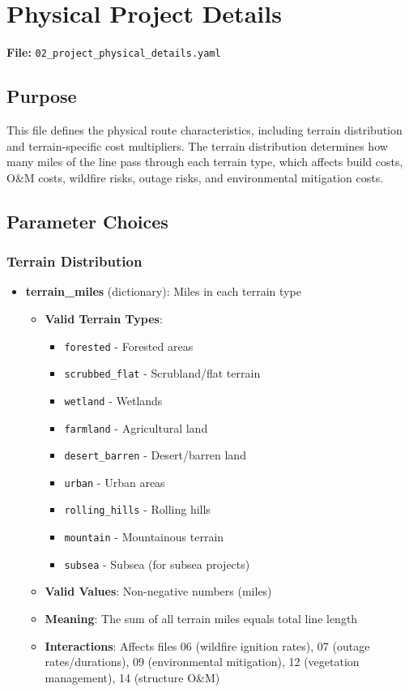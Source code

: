 \documentclass[ctcc_full_documentation.tex]{subfiles}
\begin{document}
\section{Physical Project Details}
\label{sec:physical_details}

\textbf{File:} \texttt{02\_project\_physical\_details.yaml}

\subsection{Purpose}

This file defines the physical route characteristics, including terrain distribution and terrain-specific cost multipliers. The terrain distribution determines how many miles of the line pass through each terrain type, which affects build costs, O\&M costs, wildfire risks, outage risks, and environmental mitigation costs.

\subsection{Parameter Choices}

\subsubsection{Terrain Distribution}

\begin{itemize}
    \item \textbf{terrain\_miles} (dictionary): Miles in each terrain type
    \begin{itemize}
        \item \textbf{Valid Terrain Types}:
        \begin{itemize}
            \item \texttt{forested} - Forested areas
            \item \texttt{scrubbed\_flat} - Scrubland/flat terrain
            \item \texttt{wetland} - Wetlands
            \item \texttt{farmland} - Agricultural land
            \item \texttt{desert\_barren} - Desert/barren land
            \item \texttt{urban} - Urban areas
            \item \texttt{rolling\_hills} - Rolling hills
            \item \texttt{mountain} - Mountainous terrain
            \item \texttt{subsea} - Subsea (for subsea projects)
        \end{itemize}
        \item \textbf{Valid Values}: Non-negative numbers (miles)
        \item \textbf{Meaning}: The sum of all terrain miles equals total line length
        \item \textbf{Interactions}: Affects files 06 (wildfire ignition rates), 07 (outage rates/durations), 09 (environmental mitigation), 12 (vegetation management), 14 (structure O\&M)
    \end{itemize}
\end{itemize}
\end{document}
